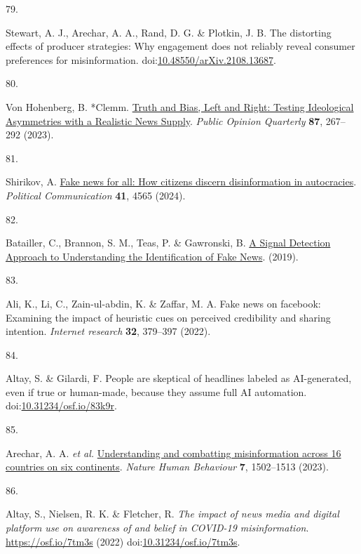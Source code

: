 \documentclass[
  man]{apa6}
\newlength{\cslhangindent}
\newlength{\csllabelwidth}
\newenvironment{CSLReferences}[2] %
 {\begin{list}{}{%
  \setlength{\itemindent}{0pt}
  \setlength{\leftmargin}{0pt}
  \setlength{\parsep}{0pt}
  \ifodd #1
   \setlength{\leftmargin}{\cslhangindent}
   \setlength{\itemindent}{-1\cslhangindent}
  \fi
  \setlength{\itemsep}{#2\baselineskip}}}
 {\end{list}}
\newcommand{\CSLLeftMargin}[1]{\parbox[t]{\csllabelwidth}{\strut#1\strut}}
\newcommand{\CSLRightInline}[1]{\parbox[t]{\linewidth - \csllabelwidth}{\strut#1\strut}}
\begin{document}
\begin{CSLReferences}{0}{0}
\CSLLeftMargin{79. }%
\CSLRightInline{Stewart, A. J., Arechar, A. A., Rand, D. G. \& Plotkin, J. B. The distorting effects of producer strategies: Why engagement does not reliably reveal consumer preferences for misinformation. doi:\href{https://doi.org/10.48550/arXiv.2108.13687}{10.48550/arXiv.2108.13687}.}

\CSLLeftMargin{80. }%
\CSLRightInline{Von Hohenberg, B. *Clemm. \href{https://doi.org/10.1093/poq/nfad013}{Truth and Bias, Left and Right: Testing Ideological Asymmetries with a Realistic News Supply}. \emph{Public Opinion Quarterly} \textbf{87}, 267--292 (2023).}

\CSLLeftMargin{81. }%
\CSLRightInline{*Shirikov, A. \href{https://doi.org/10.1080/10584609.2023.2257618}{Fake news for all: How citizens discern disinformation in autocracies}. \emph{Political Communication} \textbf{41}, 4565 (2024).}

\CSLLeftMargin{82. }%
\CSLRightInline{Batailler, C., Brannon, S. M., Teas, P. \& Gawronski, B. \href{https://osf.io/uc9me/}{A Signal Detection Approach to Understanding the Identification of Fake News}. (2019).}

\CSLLeftMargin{83. }%
\CSLRightInline{*Ali, K., Li, C., Zain-ul-abdin, K. \& Zaffar, M. A. Fake news on facebook: Examining the impact of heuristic cues on perceived credibility and sharing intention. \emph{Internet research} \textbf{32}, 379--397 (2022).}

\CSLLeftMargin{84. }%
\CSLRightInline{*Altay, S. \& Gilardi, F. People are skeptical of headlines labeled as AI-generated, even if true or human-made, because they assume full AI automation. doi:\href{https://doi.org/10.31234/osf.io/83k9r}{10.31234/osf.io/83k9r}.}

\CSLLeftMargin{85. }%
\CSLRightInline{*Arechar, A. A. \emph{et al.} \href{https://doi.org/10.1038/s41562-023-01641-6}{Understanding and combatting misinformation across 16 countries on six continents}. \emph{Nature Human Behaviour} \textbf{7}, 1502--1513 (2023).}

\CSLLeftMargin{86. }%
\CSLRightInline{*Altay, S., Nielsen, R. K. \& Fletcher, R. \emph{The impact of news media and digital platform use on awareness of and belief in COVID-19 misinformation}. \url{https://osf.io/7tm3s} (2022) doi:\href{https://doi.org/10.31234/osf.io/7tm3s}{10.31234/osf.io/7tm3s}.}


\end{CSLReferences}
\end{document}
